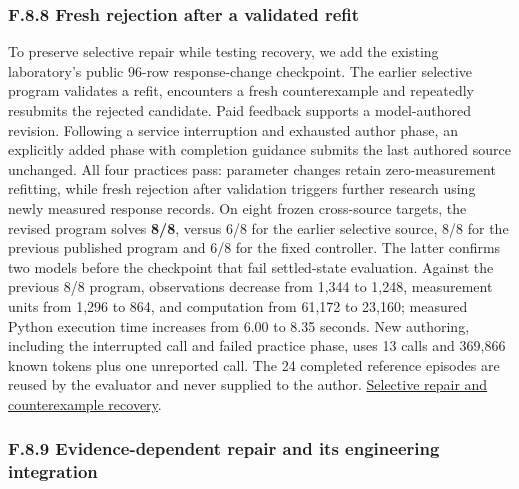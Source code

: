 \documentclass[11pt,a4paper]{article}
\begin{document}
\subsubsection*{F.8.8 Fresh rejection after a validated refit}

To preserve selective repair while testing recovery, we add the existing laboratory's
public 96-row response-change checkpoint. The earlier selective program validates
a refit, encounters a fresh counterexample and repeatedly resubmits the rejected
candidate. Paid feedback supports a model-authored revision. Following a service
interruption and exhausted author phase, an explicitly added phase with completion
guidance submits the last authored source unchanged. All four practices pass:
parameter changes retain zero-measurement refitting, while fresh rejection after
validation triggers further research using newly measured response records.
On eight frozen cross-source targets, the revised program solves \textbf{8/8}, versus
6/8 for the earlier selective source, 8/8 for the previous published program and
6/8 for the fixed controller. The latter confirms two models before the checkpoint
that fail settled-state evaluation. Against the previous 8/8 program, observations
decrease from 1,344 to 1,248, measurement units from 1,296 to 864, and computation
from 61,172 to 23,160; measured Python execution time increases from 6.00 to 8.35
seconds. New authoring, including the interrupted call and failed practice phase,
uses 13 calls and 369,866 known tokens plus one unreported call. The 24 completed
reference episodes are reused by the evaluator and never supplied to the author.
\hyperlink{artifact-89}{Selective repair and counterexample recovery}.


\subsubsection*{F.8.9 Evidence-dependent repair and its engineering integration}
\end{document}
